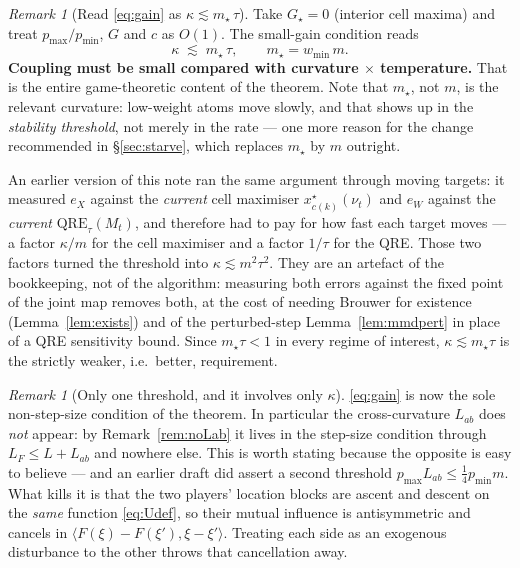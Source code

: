 \documentclass[11pt,a4paper]{article}
\theoremstyle{plain}
\theoremstyle{definition}
\theoremstyle{remark}
\newtheorem{remark}[theorem]{Remark}
\newcommand{\QRE}{\mathrm{QRE}}
\newcommand{\ip}[2]{\langle #1, #2\rangle}
\begin{document}
\begin{remark}[Read \eqref{eq:gain} as $\kappa \lesssim m_\star\,\tau$]\label{rem:tau2}
Take $G_\star=0$ (interior cell maxima) and treat $p_{\max}/p_{\min}$, $G$ and $c$ as
$O(1)$. The small-gain condition reads
\[
\kappa \;\lesssim\; m_\star\,\tau,\qquad m_\star=w_{\min}\,m .
\]
\textbf{Coupling must be small compared with curvature $\times$ temperature.} That is the
entire game-theoretic content of the theorem. Note that $m_\star$, not $m$, is the
relevant curvature: low-weight atoms move slowly, and that shows up in the
\emph{stability threshold}, not merely in the rate --- one more reason for the change
recommended in \S\ref{sec:starve}, which replaces $m_\star$ by $m$ outright.

An earlier version of this note ran the same argument through moving targets: it
measured $e_X$ against the \emph{current} cell maximiser $x^\star_{c(k)}(\nu_t)$ and
$e_W$ against the \emph{current} $\QRE_\tau(M_t)$, and therefore had to pay for how fast
each target moves --- a factor $\kappa/m$ for the cell maximiser and a factor $1/\tau$ for
the QRE. Those two factors turned the threshold into $\kappa\lesssim m^2\tau^2$. They are
an artefact of the bookkeeping, not of the algorithm: measuring both errors against the
fixed point of the joint map removes both, at the cost of needing Brouwer for existence
(Lemma~\ref{lem:exists}) and of the perturbed-step Lemma~\ref{lem:mmdpert} in place of a
QRE sensitivity bound. Since $m_\star\tau<1$ in every regime of interest,
$\kappa\lesssim m_\star\tau$ is the strictly weaker, i.e.\ better, requirement.
\end{remark}

\begin{remark}[Only one threshold, and it involves only $\kappa$]
\eqref{eq:gain} is now the sole non-step-size condition of the theorem. In particular
the cross-curvature $L_{ab}$ does \emph{not} appear: by Remark~\ref{rem:noLab} it lives
in the step-size condition through $L_F\le L+L_{ab}$ and nowhere else. This is worth
stating because the opposite is easy to believe --- and an earlier draft did assert a
second threshold $p_{\max}L_{ab}\le\tfrac14p_{\min}m$. What kills it is that the two
players' location blocks are ascent and descent on the \emph{same} function
\eqref{eq:Udef}, so their mutual influence is antisymmetric and cancels in
$\ip{F(\xi)-F(\xi')}{\xi-\xi'}$. Treating each side as an exogenous disturbance to the
other throws that cancellation away.
\end{remark}
\end{document}
